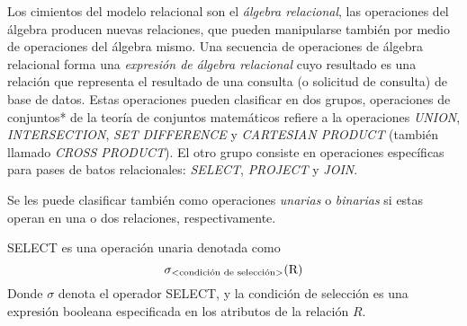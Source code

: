 Los cimientos del modelo relacional son el \emph{álgebra relacional}, las operaciones del álgebra producen nuevas relaciones, que pueden manipularse también por medio de operaciones del álgebra mismo. Una secuencia de operaciones de álgebra relacional forma una \emph{expresión de álgebra relacional} cuyo resultado es una relación que representa el resultado de una consulta (o solicitud de consulta) de base de datos. Estas operaciones pueden clasificar en dos grupos, operaciones de conjuntos* de la teoría de conjuntos matemáticos refiere a la operaciones \emph{UNION}, \emph{INTERSECTION}, \emph{SET DIFFERENCE} y \emph{CARTESIAN PRODUCT} (también llamado \emph{CROSS PRODUCT}). El otro grupo consiste en operaciones específicas para pases de batos relacionales: \emph{SELECT}, \emph{PROJECT} y \emph{JOIN}.

Se les puede clasificar también como operaciones \emph{unarias} o \emph{binarias} si estas operan en una o dos relaciones, respectivamente.

SELECT es una operación unaria denotada como
\begin{equation}
\sigma_\text{\textless condición de selección\textgreater}{\text{(R)}}
\end{equation}
Donde $\sigma$ denota el operador SELECT, y la condición de selección es una expresión booleana especificada en los atributos de la relación $R$.